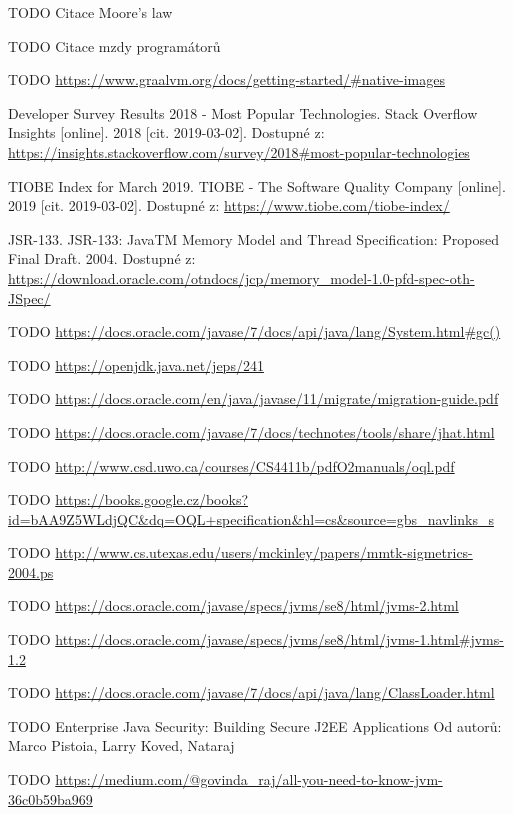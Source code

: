 \begin{literatura}{99}

    TODO Citace Moore's law

    TODO Citace mzdy programátorů

    TODO \url{https://www.graalvm.org/docs/getting-started/#native-images}

	Developer Survey Results 2018 - Most Popular Technologies. Stack Overflow Insights [online]. 2018 [cit. 2019-03-02]. Dostupné z: \url{https://insights.stackoverflow.com/survey/2018#most-popular-technologies}

    TIOBE Index for March 2019. TIOBE - The Software Quality Company [online]. 2019 [cit. 2019-03-02]. Dostupné z: \url{https://www.tiobe.com/tiobe-index/}

    JSR-133. JSR-133: JavaTM Memory Model and Thread Specification: Proposed Final Draft. 2004. Dostupné z: \url{https://download.oracle.com/otndocs/jcp/memory_model-1.0-pfd-spec-oth-JSpec/}
    
    TODO \url{https://docs.oracle.com/javase/7/docs/api/java/lang/System.html#gc()}

    TODO \url{https://openjdk.java.net/jeps/241}

    TODO \url{https://docs.oracle.com/en/java/javase/11/migrate/migration-guide.pdf }

    TODO \url{https://docs.oracle.com/javase/7/docs/technotes/tools/share/jhat.html}

    TODO \url{http://www.csd.uwo.ca/courses/CS4411b/pdfO2manuals/oql.pdf}

    TODO \url{https://books.google.cz/books?id=bAA9Z5WLdjQC&dq=OQL+specification&hl=cs&source=gbs_navlinks_s}

    TODO \url{http://www.cs.utexas.edu/users/mckinley/papers/mmtk-sigmetrics-2004.ps}

    TODO \url{https://docs.oracle.com/javase/specs/jvms/se8/html/jvms-2.html}

    TODO \url{https://docs.oracle.com/javase/specs/jvms/se8/html/jvms-1.html#jvms-1.2}

    TODO \url{https://docs.oracle.com/javase/7/docs/api/java/lang/ClassLoader.html}

    TODO Enterprise Java Security: Building Secure J2EE Applications
    Od autorů: Marco Pistoia, Larry Koved, Nataraj 

    TODO \url{https://medium.com/@govinda_raj/all-you-need-to-know-jvm-36c0b59ba969}

\end{literatura}